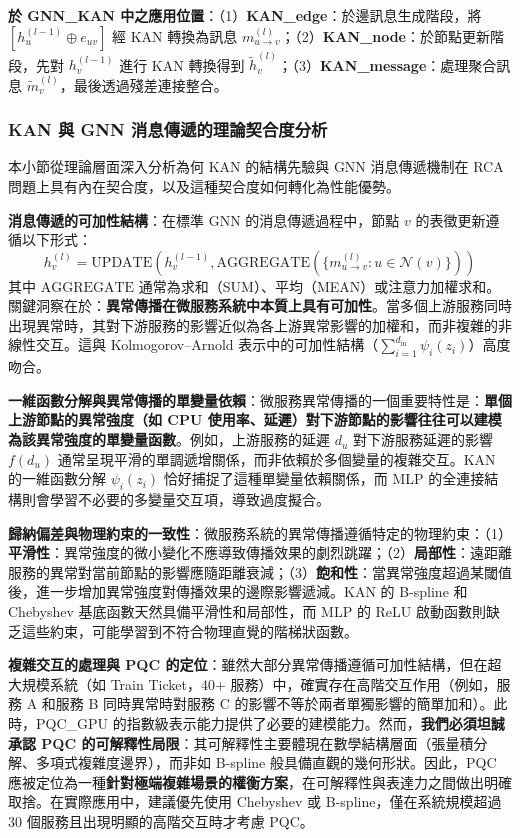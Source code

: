 \documentclass[10pt,a4paper,twocolumn]{article}
\begin{document}
\textbf{於 GNN\_KAN 中之應用位置}：（1）\textbf{KAN\_edge}：於邊訊息生成階段，將 $[h_u^{(l-1)} \oplus e_{uv}]$ 經 KAN 轉換為訊息 $m_{u \to v}^{(l)}$；（2）\textbf{KAN\_node}：於節點更新階段，先對 $h_v^{(l-1)}$ 進行 KAN 轉換得到 $\tilde{h}_v^{(l)}$；（3）\textbf{KAN\_message}：處理聚合訊息 $\tilde{m}_v^{(l)}$，最後透過殘差連接整合。

\subsubsection{KAN 與 GNN 消息傳遞的理論契合度分析}

本小節從理論層面深入分析為何 KAN 的結構先驗與 GNN 消息傳遞機制在 RCA 問題上具有內在契合度，以及這種契合度如何轉化為性能優勢。

\textbf{消息傳遞的可加性結構}：在標準 GNN 的消息傳遞過程中，節點 $v$ 的表徵更新遵循以下形式：
\begin{equation}
h_v^{(l)} = \text{UPDATE}\left(h_v^{(l-1)}, \text{AGGREGATE}\left(\{m_{u \to v}^{(l)} : u \in \mathcal{N}(v)\}\right)\right)
\end{equation}
其中 $\text{AGGREGATE}$ 通常為求和（SUM）、平均（MEAN）或注意力加權求和。關鍵洞察在於：\textbf{異常傳播在微服務系統中本質上具有可加性}。當多個上游服務同時出現異常時，其對下游服務的影響近似為各上游異常影響的加權和，而非複雜的非線性交互。這與 Kolmogorov–Arnold 表示中的可加性結構（$\sum_{i=1}^{d_{\text{in}}} \psi_i(z_i)$）高度吻合。

\textbf{一維函數分解與異常傳播的單變量依賴}：微服務異常傳播的一個重要特性是：\textbf{單個上游節點的異常強度（如 CPU 使用率、延遲）對下游節點的影響往往可以建模為該異常強度的單變量函數}。例如，上游服務的延遲 $d_u$ 對下游服務延遲的影響 $f(d_u)$ 通常呈現平滑的單調遞增關係，而非依賴於多個變量的複雜交互。KAN 的一維函數分解 $\psi_i(z_i)$ 恰好捕捉了這種單變量依賴關係，而 MLP 的全連接結構則會學習不必要的多變量交互項，導致過度擬合。

\textbf{歸納偏差與物理約束的一致性}：微服務系統的異常傳播遵循特定的物理約束：（1）\textbf{平滑性}：異常強度的微小變化不應導致傳播效果的劇烈跳躍；（2）\textbf{局部性}：遠距離服務的異常對當前節點的影響應隨距離衰減；（3）\textbf{飽和性}：當異常強度超過某閾值後，進一步增加異常強度對傳播效果的邊際影響遞減。KAN 的 B-spline 和 Chebyshev 基底函數天然具備平滑性和局部性，而 MLP 的 ReLU 啟動函數則缺乏這些約束，可能學習到不符合物理直覺的階梯狀函數。

\textbf{複雜交互的處理與 PQC 的定位}：雖然大部分異常傳播遵循可加性結構，但在超大規模系統（如 Train Ticket，40+ 服務）中，確實存在高階交互作用（例如，服務 A 和服務 B 同時異常時對服務 C 的影響不等於兩者單獨影響的簡單加和）。此時，PQC\_GPU 的指數級表示能力提供了必要的建模能力。然而，\textbf{我們必須坦誠承認 PQC 的可解釋性局限}：其可解釋性主要體現在數學結構層面（張量積分解、多項式複雜度邊界），而非如 B-spline 般具備直觀的幾何形狀。因此，PQC 應被定位為一種\textbf{針對極端複雜場景的權衡方案}，在可解釋性與表達力之間做出明確取捨。在實際應用中，建議優先使用 Chebyshev 或 B-spline，僅在系統規模超過 30 個服務且出現明顯的高階交互時才考慮 PQC。
\end{document}

